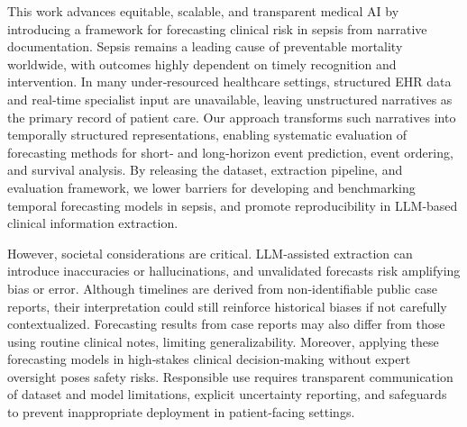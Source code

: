 This work advances equitable, scalable, and transparent medical AI by introducing a framework for forecasting clinical risk in sepsis from narrative documentation. Sepsis remains a leading cause of preventable mortality worldwide, with outcomes highly dependent on timely recognition and intervention. In many under‑resourced healthcare settings, structured EHR data and real‑time specialist input are unavailable, leaving unstructured narratives as the primary record of patient care. Our approach transforms such narratives into temporally structured representations, enabling systematic evaluation of forecasting methods for short‑ and long‑horizon event prediction, event ordering, and survival analysis. By releasing the dataset, extraction pipeline, and evaluation framework, we lower barriers for developing and benchmarking temporal forecasting models in sepsis, and promote reproducibility in LLM‑based clinical information extraction.

However, societal considerations are critical. LLM‑assisted extraction can introduce inaccuracies or hallucinations, and unvalidated forecasts risk amplifying bias or error. Although timelines are derived from non‑identifiable public case reports, their interpretation could still reinforce historical biases if not carefully contextualized. Forecasting results from case reports may also differ from those using routine clinical notes, limiting generalizability. Moreover, applying these forecasting models in high‑stakes clinical decision‑making without expert oversight poses safety risks. Responsible use requires transparent communication of dataset and model limitations, explicit uncertainty reporting, and safeguards to prevent inappropriate deployment in patient‑facing settings.

%